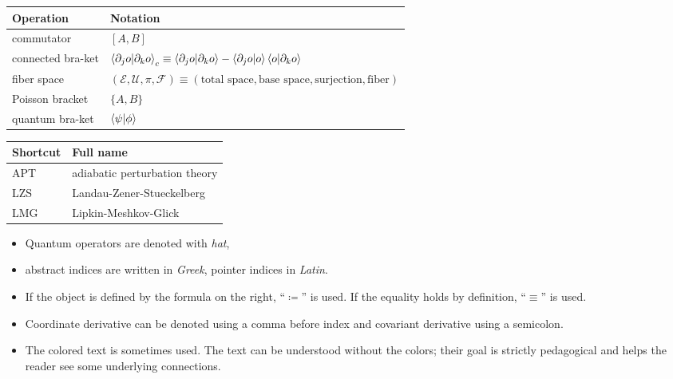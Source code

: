 	  \begin{tabular} {@{}C{4cm}@{}p{9.67cm}}
	\toprule
	\textbf{Operation}& \textbf{Notation}\\\bottomrule	
	commutator & $[A,B]$ \\
	connected bra-ket & $\braket{\partial_j o|\partial_k o}_c \equiv \braket{\partial_j o|\partial_k o} - \braket{\partial_j o|o}\braket{o|\partial_k o}$\\
	fiber space & $(\mathcal{E},\mathcal{U},\pi,\mathcal{F})\equiv(\text{total space},\text{base space}, \text{surjection},\text{fiber})$\\
	Poisson bracket & $\{A,B\}$ \\
	quantum bra-ket & $\braket{\psi|\phi}$\\
	\bottomrule
\end{tabular}


\begin{tabular} {@{}C{4cm}@{}p{9.67cm}}
	\toprule
	\textbf{Shortcut}& \textbf{Full name}\\\bottomrule
	
	APT & adiabatic perturbation theory \\
	LZS & Landau-Zener-Stueckelberg\\
	LMG & Lipkin-Meshkov-Glick \\
	\bottomrule
\end{tabular}


\begin{itemize}
    \item Quantum operators are denoted with \emph{hat}, 
    \item abstract indices are written in \emph{Greek}, pointer indices in \emph{Latin}. 
    \item If the object is defined by the formula on the right, “$\coloneqq$” is used. If the equality holds by definition, “$\equiv$” is used. 
    \item Coordinate derivative can be denoted using a comma before index and covariant derivative using a semicolon. 
    \item The colored text is sometimes used. The text can be understood without the colors; their goal is strictly pedagogical and helps the reader see some underlying connections.
\end{itemize}